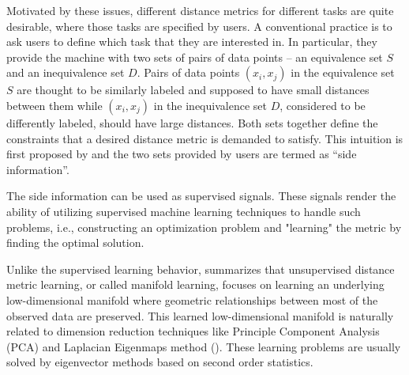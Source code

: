 \documentclass[12pt]{article}
\begin{document}
Motivated by these issues, different distance metrics for different tasks are quite desirable, where those tasks are specified by users. A conventional practice is to ask users to define which task that they are interested in. In particular, they provide the machine with two sets of pairs of data points -- an  equivalence set $S$ and an inequivalence set $D$. 
Pairs of data points $(x_i,x_j)$ in the equivalence set $S$ are thought to be similarly labeled and supposed to have small distances between them while $(x_i,x_j)$ in the inequivalence set $D$, considered to be differently labeled, should have large distances.
Both sets together define the constraints that                                                                                                                                                                                                                                                                                                                                                                                                                                                                                                                                                                                                                                                                                                                                                                                                                                                                                                                                           a desired distance metric is demanded to satisfy.  This intuition is first proposed by \citet{xing2003distance} and the two sets provided by users are termed as ``side information''. 

The side information can be used as supervised signals. These signals render the ability of utilizing supervised machine learning techniques to handle such problems, i.e., constructing an optimization problem and "learning" the metric by finding the optimal solution. 

Unlike the supervised learning behavior, \cite{yang2006distance} summarizes that unsupervised distance metric learning, or called manifold learning, focuses on learning an underlying low-dimensional manifold where geometric relationships between most of the observed data are preserved. This learned low-dimensional manifold is naturally related to dimension reduction techniques like Principle Component Analysis (PCA) and Laplacian Eigenmaps method (\cite{belkin2002laplacian}). These learning problems are usually solved by eigenvector methods based on second order statistics.
\end{document}
